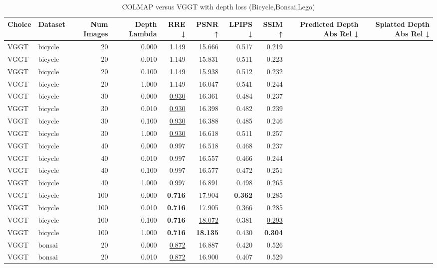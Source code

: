 \begin{table}[H]
\caption{COLMAP versus VGGT with depth loss (Bicycle,Bonsai,Lego)}
\label{tab:05_depth_lambda_num_images_bicycle,bonsai,lego}
\small
\begin{tabular}{llrrrrrrrr}
\toprule
Choice & Dataset & Num Images & Depth Lambda & RRE ↓ & PSNR ↑ & LPIPS ↓ & SSIM ↑ & Predicted Depth Abs Rel ↓ & Splatted Depth Abs Rel ↓ \\
\midrule
VGGT & bicycle & 20 & 0.000 & 1.149 & 15.666 & 0.517 & 0.219 &  &  \\
VGGT & bicycle & 20 & 0.010 & 1.149 & 15.831 & 0.511 & 0.223 &  &  \\
VGGT & bicycle & 20 & 0.100 & 1.149 & 15.938 & 0.512 & 0.232 &  &  \\
VGGT & bicycle & 20 & 1.000 & 1.149 & 16.047 & 0.541 & 0.244 &  &  \\
VGGT & bicycle & 30 & 0.000 & \underline{0.930} & 16.361 & 0.484 & 0.237 &  &  \\
VGGT & bicycle & 30 & 0.010 & \underline{0.930} & 16.398 & 0.482 & 0.239 &  &  \\
VGGT & bicycle & 30 & 0.100 & \underline{0.930} & 16.388 & 0.485 & 0.246 &  &  \\
VGGT & bicycle & 30 & 1.000 & \underline{0.930} & 16.618 & 0.511 & 0.257 &  &  \\
VGGT & bicycle & 40 & 0.000 & 0.997 & 16.518 & 0.468 & 0.237 &  &  \\
VGGT & bicycle & 40 & 0.010 & 0.997 & 16.557 & 0.466 & 0.244 &  &  \\
VGGT & bicycle & 40 & 0.100 & 0.997 & 16.577 & 0.472 & 0.251 &  &  \\
VGGT & bicycle & 40 & 1.000 & 0.997 & 16.891 & 0.498 & 0.265 &  &  \\
VGGT & bicycle & 100 & 0.000 & \textbf{0.716} & 17.904 & \textbf{0.362} & 0.285 &  &  \\
VGGT & bicycle & 100 & 0.010 & \textbf{0.716} & 17.905 & \underline{0.366} & 0.285 &  &  \\
VGGT & bicycle & 100 & 0.100 & \textbf{0.716} & \underline{18.072} & 0.381 & \underline{0.293} &  &  \\
VGGT & bicycle & 100 & 1.000 & \textbf{0.716} & \textbf{18.135} & 0.430 & \textbf{0.304} &  &  \\
\midrule
VGGT & bonsai & 20 & 0.000 & \underline{0.872} & 16.887 & 0.420 & 0.526 &  &  \\
VGGT & bonsai & 20 & 0.010 & \underline{0.872} & 16.900 & 0.407 & 0.529 &  &  \\

\end{tabular}
\end{table}
